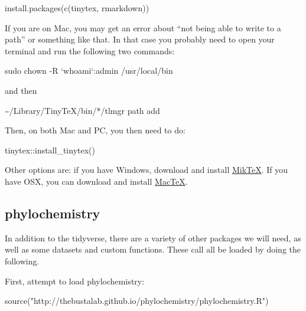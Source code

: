 \documentclass[
]{krantz}
\newenvironment{Shaded}{\begin{snugshade}}{\end{snugshade}}
\newcommand{\FunctionTok}[1]{\textcolor[rgb]{0.00,0.00,0.00}{#1}}
\newcommand{\NormalTok}[1]{#1}
\newcommand{\SpecialCharTok}[1]{\textcolor[rgb]{0.00,0.00,0.00}{#1}}
\newcommand{\StringTok}[1]{\textcolor[rgb]{0.31,0.60,0.02}{#1}}
\begin{document}
\begin{Shaded}
\begin{Highlighting}[]
\FunctionTok{install.packages}\NormalTok{(}\FunctionTok{c}\NormalTok{(}\StringTok{\textquotesingle{}tinytex\textquotesingle{}}\NormalTok{, }\StringTok{\textquotesingle{}rmarkdown\textquotesingle{}}\NormalTok{))}
\end{Highlighting}
\end{Shaded}

If you are on Mac, you may get an error about ``not being able to write to a path'' or something like that. In that case you probably need to open your terminal and run the following two commands:

sudo chown -R `whoami`:admin /usr/local/bin

and then

\textasciitilde/Library/TinyTeX/bin/*/tlmgr path add

Then, on both Mac and PC, you then need to do:

\begin{Shaded}
\begin{Highlighting}[]
\NormalTok{tinytex}\SpecialCharTok{::}\FunctionTok{install\_tinytex}\NormalTok{()}
\end{Highlighting}
\end{Shaded}

Other options are: if you have Windows, download and install \href{https://miktex.org/download}{MikTeX}. If you have OSX, you can download and install \href{http://www.tug.org/mactex/morepackages.html}{MacTeX}.

\hypertarget{phylochemistry}{%
\subsection{phylochemistry}\label{phylochemistry}}

In addition to the tidyverse, there are a variety of other packages we will need, as well as some datasets and custom functions. These call all be loaded by doing the following.

First, attempt to load phylochemistry:

\begin{Shaded}
\begin{Highlighting}[]
\FunctionTok{source}\NormalTok{(}\StringTok{"http://thebustalab.github.io/phylochemistry/phylochemistry.R"}\NormalTok{)}
\end{Highlighting}
\end{Shaded}
\end{document}
